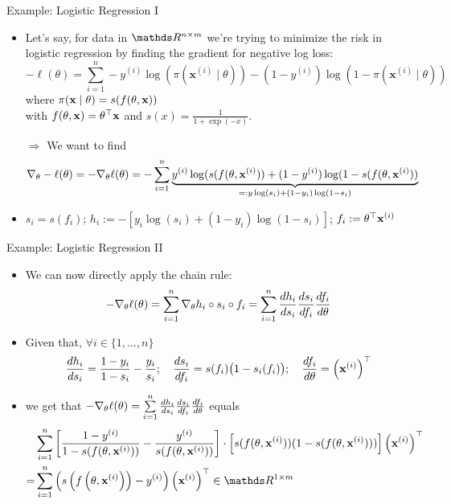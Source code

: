 \documentclass[11pt,compress,t,notes=noshow, xcolor=table]{beamer}
\newcommand{\deriv}{d}
\begin{document}
\begin{vbframe}{Example: Logistic Regression I}
\begin{itemize}    \setlength{\itemsep}{0.5\baselineskip}
    \item Let's say, for data in $\R^{n\times m}$ we're trying to minimize the risk in logistic regression by finding the gradient for negative log loss:
\[
-\ell({\theta})=\sum_{i=1}^n-y^{(i)} \log \left(\pi\left(\mathbf{x}^{(i)} \mid \theta\right)\right)-\left(1-y^{(i)}\right) \log \left(1-\pi\left(\mathbf{x}^{(i)} \mid \theta\right)\right)
\]
where $
\pi(\mathbf{x} \mid {\theta})=s(f(\theta,\mathbf{x}))
$\\[5pt] with 
$f(\theta,\mathbf{x})=\theta^{\top} \mathbf{x}$ and $s(x)=\frac{1}{1+\exp (-x)}$.
\item[$\Rightarrow$] We want to find \begin{align*}
\nabla_\theta -\ell (\theta)=-\nabla_\theta \ell (\theta)&=-\sum\limits_{i=1}^n\underbrace{ y^{(i)} \log (s(f(\theta,\mathbf{x}^{(i)}))+(1-y^{(i)}) \log (1-s(f(\theta,\mathbf{x}^{(i)}))}_{=:y \log (s_i)+(1-y_i) \log (1-s_i)}
\end{align*}
\item $s_i = s(f_i)$; $h_i:=-[y_i \log (s_i)+(1-y_i) \log (1-s_i)]$; $f_i:=\theta^{\top} \mathbf{x}^{(i)}$
\end{itemize}
\end{vbframe}

\begin{vbframe}{Example: Logistic Regression II}
\begin{itemize}    \setlength{\itemsep}{0.5\baselineskip}
\item We can now directly apply the chain rule:
$$
-\nabla_\theta \ell (\theta)=\sumin\nabla_\theta h_i\circ s_i \circ f_i=\sumin\frac{\deriv h_i}{\deriv s_i} \frac{\deriv s_i}{\deriv f_i} \frac{\deriv f_i}{\deriv \theta}
$$
    \item Given that, $\forall i\in\{1,\dots,n\}$ $$\frac{\deriv h_i}{\deriv s_i}=\frac{1-y_i}{1-s_i}-\frac{y_i}{s_i};\quad\frac{\deriv s_i}{\deriv f_i}=s(f_i)\big(1-s_i(f_i)\big);\quad\frac{\deriv f_i}{\deriv \theta}=\left(\xv^{(i)}\right)^\top$$
    \item we get that $-\nabla_\theta \ell (\theta)=\sumin\frac{\deriv h_i}{\deriv s_i} \frac{\deriv s_i}{\deriv f_i} \frac{\deriv f_i}{\deriv \theta}$  equals\begin{align*}
        &\sumin \left[\frac{1-y^{(i)}}{1-s(f(\theta, \xv^{(i)}))}-\frac{y^{(i)}}{s(f(\theta, \xv^{(i)}))}\right] \cdot \left[s(f(\theta, \xv^{(i)}))(1-s(f(\theta, \xv^{(i)})))\right] \left(\xv^{(i)}\right)^\top\\
        =&\sumin\left(s\left(f\left(\theta,\xv^{(i)}\right)\right)-y^{(i)}\right)\left(\xv^{(i)}\right)^\top\in\R^{1\times m}
    \end{align*}
\end{itemize}
\end{vbframe}
\end{document}

